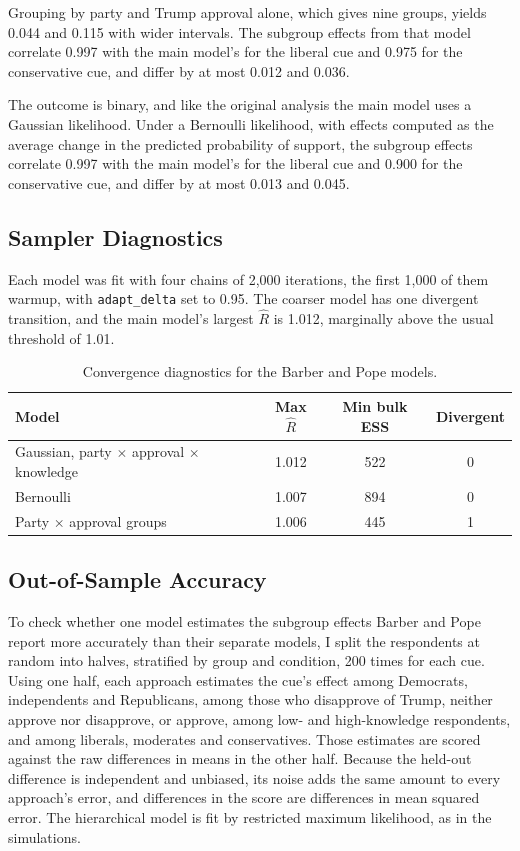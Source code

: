 \documentclass[12pt]{article}
\begin{document}
Grouping by party and Trump approval alone, which gives nine groups, yields 0.044 and 0.115 with wider intervals.
The subgroup effects from that model correlate 0.997 with the main model's for the liberal cue and 0.975 for the conservative cue, and differ by at most 0.012 and 0.036.

The outcome is binary, and like the original analysis the main model uses a Gaussian likelihood.
Under a Bernoulli likelihood, with effects computed as the average change in the predicted probability of support, the subgroup effects correlate 0.997 with the main model's for the liberal cue and 0.900 for the conservative cue, and differ by at most 0.013 and 0.045.

\subsection{Sampler Diagnostics}

Each model was fit with four chains of 2,000 iterations, the first 1,000 of them warmup, with \texttt{adapt\_delta} set to 0.95.
The coarser model has one divergent transition, and the main model's largest $\hat{R}$ is 1.012, marginally above the usual threshold of 1.01.

\begin{table}[htpb]
\begin{center}
\begin{tabular}{lccc}
\hline
Model & Max $\hat{R}$ & Min bulk ESS & Divergent \\
\hline
Gaussian, party $\times$ approval $\times$ knowledge & 1.012 & 522 & 0 \\
Bernoulli & 1.007 & 894 & 0 \\
Party $\times$ approval groups & 1.006 & 445 & 1 \\
\hline
\end{tabular}
\caption{Convergence diagnostics for the Barber and Pope models.}
\label{tab:bp-diag}
\end{center}
\end{table}

\subsection{Out-of-Sample Accuracy}

To check whether one model estimates the subgroup effects Barber and Pope report more accurately than their separate models, I split the respondents at random into halves, stratified by group and condition, 200 times for each cue.
Using one half, each approach estimates the cue's effect among Democrats, independents and Republicans, among those who disapprove of Trump, neither approve nor disapprove, or approve, among low- and high-knowledge respondents, and among liberals, moderates and conservatives.
Those estimates are scored against the raw differences in means in the other half.
Because the held-out difference is independent and unbiased, its noise adds the same amount to every approach's error, and differences in the score are differences in mean squared error.
The hierarchical model is fit by restricted maximum likelihood, as in the simulations.
\end{document}
